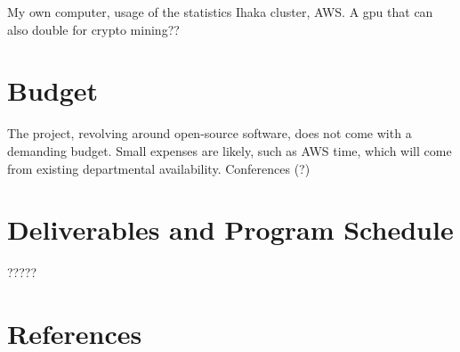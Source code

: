 \documentclass[a4paper,10pt]{article}
\begin{document}
My own computer, usage of the statistics Ihaka cluster, AWS.
A gpu that can also double for crypto mining??

\section{Budget}

The project, revolving around open-source software, does not come with a demanding budget.
Small expenses are likely, such as AWS time, which will come from existing departmental availability.
Conferences (?)

\section{Deliverables and Program Schedule}

?????

\section{References}

\printbibliography
\end{document}
